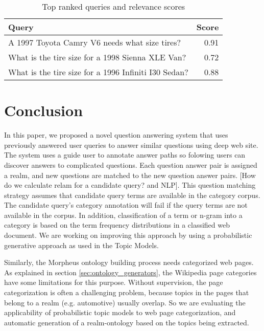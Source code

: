 \begin{table}[h]\footnotesize

\begin{tabular}{l | r}
Query & Score\\
\hline
A 1997 Toyota Camry V6 needs what size tires? & 0.91\\ 
What is the tire size for a 1998 Sienna XLE Van? & 0.72\\ 
What is the tire size for a 1996 Infiniti I30 Sedan? & 0.88\\ 
\hline
\end{tabular}        

\caption{Top ranked queries and relevance scores}
\label{tbl:ranked_queries}   

\end{table}


\section{Conclusion}

In this paper, we proposed a novel question answering system that uses previously answered user queries to answer similar questions using deep web site.  The system uses a guide user to annotate answer paths so folowing users can discover answers to complicated questions.  Each question answer pair is assigned a realm, and new questions are matched to the new question answer pairs. [How do we calculate relam for a candidate query? and NLP]. This question matching strategy assumes that candidate query terms are available in the category corpus. The candidate query's category annotation will fail if the
query terms are not available in the corpus. In addition, classification of a term or n-gram into a category is based on the term frequency distributions in a classified web document. We are working on improving this
approach by using a probabilistic generative approach as used in the Topic
Models\cite{Blei2003latentdirichlet}. 

Similarly, the Morpheus ontology building
process needs categorized web pages. As explained in section
\ref{sec:ontology_generators}, the Wikipedia page categories have some
limitations for this purpose. Without supervision, the page categorization is
often a challenging problem, because topics in the pages that belong to a realm
(e.g. automotive) usually overlap. So we are evaluating the applicability of
probabilistic topic models to web page categorization, and automatic
generation of a realm-ontology based on the topics being extracted.            
 


